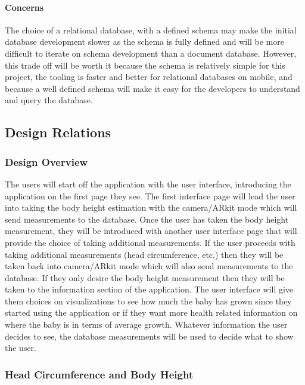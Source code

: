 \documentclass[onecolumn, draftclsnofoot,10pt, compsoc]{IEEEtran}
\begin{document}
\paragraph{Concerns}

The choice of a relational database, with a defined schema may make the initial database development slower as the schema is fully defined and will be more difficult to iterate on schema development than a document database. However, this trade off will be worth it because the schema is relatively simple for this project, the tooling is faster and better for relational databases on mobile, and because a well defined schema will make it easy for the developers to understand and query the database.\\

\subsection{Design Relations}

\subsubsection{Design Overview}

The users will start off the application with the user interface, introducing the application on the first page they see. The first interface page will lead the user into taking the body height estimation with the camera/ARkit mode which will send measurements to the database. Once the user has taken the body height measurement, they will be introduced with another user interface page that will provide the choice of taking additional measurements. If the user proceeds with taking additional measurements (head circumference, etc.) then they will be taken back into camera/ARkit mode which will also send measurements to the database. If they only desire the body height measurement then they will be taken to the information section of the application. The user interface will give them choices on visualizations to see how much the baby has grown since they started using the application or if they want more health related information on where the baby is in terms of average growth. Whatever information the user decides to see, the database measurements will be used to decide what to show the user.

\subsubsection{Head Circumference and Body Height}
\end{document}
